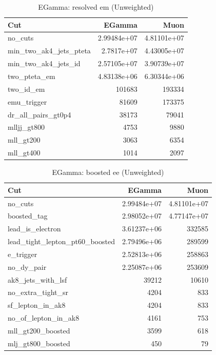 \documentclass{article}
\begin{document}
\begin{table}[htbp]
\centering
\caption{EGamma: resolved em (Unweighted)}
\begin{tabular}{lrr}
\hline
Cut & EGamma & Muon \\
\hline
no\_cuts & 2.99484e+07 & 4.81101e+07 \\
min\_two\_ak4\_jets\_pteta & 2.7817e+07 & 4.43005e+07 \\
min\_two\_ak4\_jets\_id & 2.57105e+07 & 3.90739e+07 \\
two\_pteta\_em & 4.83138e+06 & 6.30344e+06 \\
two\_id\_em & 101683 & 193334 \\
emu\_trigger & 81609 & 173375 \\
dr\_all\_pairs\_gt0p4 & 38173 & 79041 \\
mlljj\_gt800 & 4753 & 9880 \\
mll\_gt200 & 3063 & 6354 \\
mll\_gt400 & 1014 & 2097 \\
\hline
\end{tabular}
\end{table}

\begin{table}[htbp]
\centering
\caption{EGamma: boosted ee (Unweighted)}
\begin{tabular}{lrr}
\hline
Cut & EGamma & Muon \\
\hline
no\_cuts & 2.99484e+07 & 4.81101e+07 \\
boosted\_tag & 2.98052e+07 & 4.77147e+07 \\
lead\_is\_electron & 3.61237e+06 & 332585 \\
lead\_tight\_lepton\_pt60\_boosted & 2.79496e+06 & 289599 \\
e\_trigger & 2.52813e+06 & 258863 \\
no\_dy\_pair & 2.25087e+06 & 253609 \\
ak8\_jets\_with\_lsf & 39212 & 10610 \\
no\_extra\_tight\_sr & 4204 & 833 \\
sf\_lepton\_in\_ak8 & 4204 & 833 \\
no\_of\_lepton\_in\_ak8 & 4161 & 753 \\
mll\_gt200\_boosted & 3599 & 618 \\
mlj\_gt800\_boosted & 450 & 79 \\
\hline
\end{tabular}
\end{table}
\end{document}
